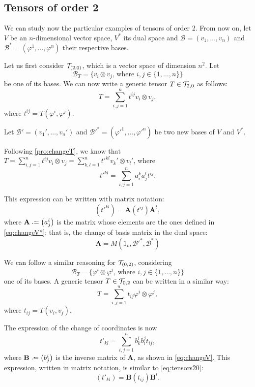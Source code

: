 \subsection*{Tensors of order 2}
\label{sub:order2}

We can study now the particular examples of tensors of order 2. From now on, let $V$ be an $n$-dimensional vector space, $V^*$ its dual space and $\mathcal{B} = (v_1, \dots, v_n)$ and $\mathcal{B^*} = (\varphi^1, \dots, \varphi^n)$ their respective bases.

Let us first consider ${\mathcal T}_{(2,0)}$, which is a vector space of dimension $n^2$. Let
\[
	\mathcal{B}_T = \{v_i \otimes v_j \textrm{, where } i,j \in \{1,\dots,n\}\}
\]
be one of its bases. We can now write a generic tensor $T\in{\mathcal T}_{2,0}$ as follows:
\[
	T = \sum_{i,j=1}^n t^{ij} v_i \otimes v_j,
\]
where $t^{ij} = T(\varphi^i, \varphi^j)$.

Let $\mathcal{B}' = (v_1', \dots, v_n')$ and $\mathcal{B}'^* = (\varphi'^1, \dots, \varphi'^n)$ be two new bases of $V$ and $V^*$.

Following \autoref{pro:changeT}, we know that $T = \sum_{i,j=1}^n t^{ij} v_i \otimes v_j = \sum_{k,l=1}^n t'^{kl} v_k' \otimes v_l'$, where
\[
	t'^{kl} = \sum_{i,j=1}^n a^k_i a^l_j t^{ij}.
\]

This expression can be written with matrix notation:
\begin{equation}
	\label{eq:tensors20}
	\left( t'^{kl} \right) = \mathbf{A} \left( t^{ij} \right) \mathbf{A}^t,
\end{equation}
where $\mathbf{A} \defeq \left(a_j^i\right)$ is the matrix whose elements are the ones defined in \autoref{eq:changeV*}; that is, the change of basis matrix in the dual space:
\[
	\mathbf{A} = M(1_v, \mathcal{B}'^*, \mathcal{B}^*)
\]

We can follow a similar reasoning for ${\mathcal T}_{(0,2)}$, considering
\[
\mathcal{B}_T = \{\varphi^i \otimes \varphi^j \textrm{, where } i,j \in \{1,\dots,n\}\}
\]
one of its bases. A generic tensor $T\in{\mathcal T}_{0,2}$ can be written in a similar way:
\[
T = \sum_{i,j=1}^n t_{ij} \varphi^i \otimes \varphi^j,
\]
where $t_{ij} = T(v_i, v_j)$.

The expression of the change of coordinates is now
\[
	t'_{kl} = \sum_{i,j=1}^n b_k^i b_l^j t_{ij},
\]
where $\mathbf{B} \defeq \left( b^i_j \right)$ is the inverse matrix of $\mathbf{A}$, as shown in \autoref{eq:changeV}. This expression, written in matrix notation, is similar to \autoref{eq:tensors20}:
\begin{equation}
	\label{eq:tensors02}
	\left( t'_{kl} \right) = \mathbf{B} \left( t_{ij} \right) \mathbf{B}^t.
\end{equation}


